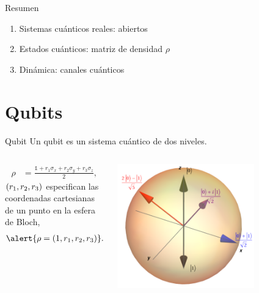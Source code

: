 \documentclass[xcolor=dvipsnames,presentation]{beamer}%
\begin{document}
\begin{frame}{Resumen}
	\begin{enumerate}
		\item Sistemas cuánticos reales: abiertos
		\item Estados cuánticos: matriz de densidad $\rho$
		\item Dinámica: canales cuánticos
	\end{enumerate}
\end{frame}


\section{Qubits}

\begin{frame}{Qubit}
	Un qubit es un sistema cuántico de dos niveles.
	
	\begin{columns}
	\hspace{1cm}
	\begin{column}{0.7\textwidth}
		\begin{align*}
			\rho &= \frac{\mathds{1}+r_1\sigma_x+r_2\sigma_y+r_3\sigma_z}{2},
		\end{align*}	
		$\qty(r_1,r_2,r_3)$ especifican las coordenadas cartesianas de un 
 		punto en la esfera de Bloch,
 	\begin{align*}
 		\alert{\rho = \qty(1,r_1,r_2,r_3)}.
 	\end{align*}
	\end{column}\hspace{-1cm}
	\begin{column}{0.5\textwidth}  
  		\begin{center}
    		\includegraphics[width=0.7\textwidth]{bloch-sph}      
     \end{center}
		\end{column}
	\end{columns}
\end{frame}
\end{document}
